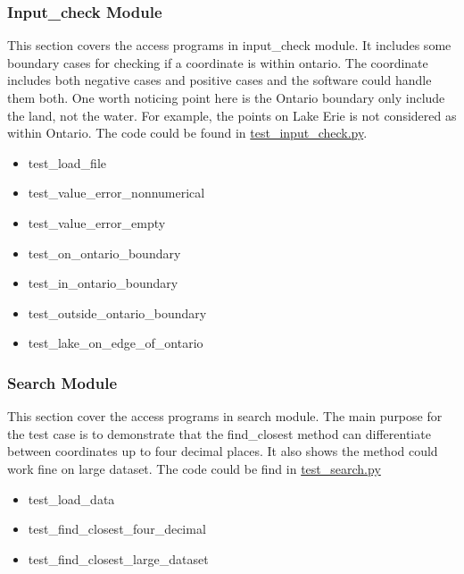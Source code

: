\documentclass[12pt, titlepage]{article}
\begin{document}
\subsubsection{Input\_check Module} \label{ICM}
This section covers the access programs in input\_check module. It includes some boundary cases for checking if a coordinate is within ontario. The coordinate includes both negative cases and positive cases and the software could handle them both. One worth noticing point here is the Ontario boundary only include the land, not the water. For example, the points on Lake Erie is not considered as within Ontario. The code could be found in \href{https://github.com/CynthiaLiu0805/BridgeCorrosion/blob/main/tests/test_input_check.py}{test\_input\_check.py}.
\begin{itemize}
\item test\_load\_file
\item test\_value\_error\_nonnumerical
\item test\_value\_error\_empty
\item test\_on\_ontario\_boundary
\item test\_in\_ontario\_boundary
\item test\_outside\_ontario\_boundary
\item test\_lake\_on\_edge\_of\_ontario
\end{itemize}

\subsubsection{Search Module} \label{SM}
This section cover the access programs in search module. The main purpose for the test case is to demonstrate that the find\_closest method can differentiate between coordinates up to four decimal places. It also shows the method could work fine on large dataset. The code could be find in \href{https://github.com/CynthiaLiu0805/BridgeCorrosion/blob/main/tests/test_search.py}{test\_search.py}
\begin{itemize}
\item test\_load\_data
\item test\_find\_closest\_four\_decimal
\item test\_find\_closest\_large\_dataset
\end{itemize}
\end{document}
